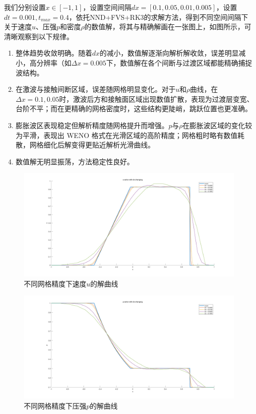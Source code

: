 \documentclass[12pt,a4paper]{article}%
\begin{document}
		我们分别设置$x \in [-1,1]$，设置空间间隔$dx=[0.1,0.05,0.01,0.005]$，设置$dt=0.001,t_{max} = 0.4$，依托NND+FVS+RK3的求解方法，得到不同空间间隔下关于速度$u$、压强$p$和密度$\rho$的数值解，将其与精确解画在一张图上，如图所示，可清晰观察到以下规律。
		\begin{enumerate}
			\item 整体趋势收敛明确。随着$dx$的减小，数值解逐渐向解析解收敛，误差明显减小，高分辨率（如$\Delta x = 0.005$下，数值解在各个间断与过渡区域都能精确捕捉波结构。
			\item 在激波与接触间断区域，误差随网格明显变化。对于$u$和$\rho$曲线，在$\Delta x = 0.1,0.05$时，激波后方和接触面区域出现数值扩散，表现为过渡层变宽、台阶不平；而在更精确的网格密度时，这些结构更陡峭，跳跃位置也更准确。
			\item 
			膨胀波区表现稳定但解析精度随网格提升而增强。$p$与$\rho$在膨胀波区域的变化较为平滑，表现出 WENO 格式在光滑区域的高阶精度；网格粗时略有数值耗散，网格细化后解变得更贴近解析光滑曲线。
			\item 数值解无明显振荡，方法稳定性良好。
		\end{enumerate}
		\begin{figure}[H]
		\centering
		\begin{minipage}{1\textwidth}
			\centering
			\includegraphics[width=\textwidth]{./fig/u.png}
			\caption{\fontsize{10pt}{15pt}\selectfont 不同网格精度下速度$u$的解曲线}
		\end{minipage}
		\end{figure}
		\begin{figure}[H]
			\centering
			\begin{minipage}{1\textwidth}
				\centering
				\includegraphics[width=\textwidth]{./fig/p.png}
				\caption{\fontsize{10pt}{15pt}\selectfont 不同网格精度下压强$p$的解曲线}
			\end{minipage}
		\end{figure}
\end{document}
